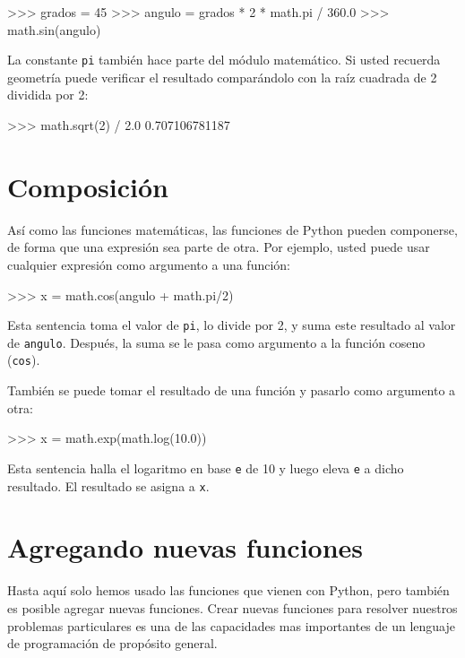 \begin{pyconcode}
>>> grados = 45
>>> angulo = grados * 2 * math.pi / 360.0
>>> math.sin(angulo)
\end{pyconcode}
 La constante \texttt{pi} también hace parte del módulo matemático.
Si usted recuerda geometría puede verificar el resultado comparándolo
con la raíz cuadrada de 2 dividida por 2:

\begin{pyconcode}
>>> math.sqrt(2) / 2.0
0.707106781187
\end{pyconcode}
 

\section{Composición}

 

Así como las funciones matemáticas, las funciones de Python pueden
componerse, de forma que una expresión sea parte de otra. Por ejemplo,
usted puede usar cualquier expresión como argumento a una función:

\begin{pyconcode}
>>> x = math.cos(angulo + math.pi/2)
\end{pyconcode}

Esta sentencia toma el valor de \texttt{pi}, lo divide por 2, y suma
este resultado al valor de \texttt{angulo}. Después, la suma se le
pasa como argumento a la función coseno (\texttt{cos}).

También se puede tomar el resultado de una función y pasarlo como
argumento a otra:
\begin{pyconcode}
>>> x = math.exp(math.log(10.0))
\end{pyconcode}

Esta sentencia halla el logaritmo en base \texttt{e} de 10 y luego
eleva \texttt{e} a dicho resultado. El resultado se asigna a \texttt{x}.

\section{Agregando nuevas funciones}

Hasta aquí solo hemos usado las funciones que vienen con Python, pero
también es posible agregar nuevas funciones. Crear nuevas funciones
para resolver nuestros problemas particulares es una de las capacidades
mas importantes de un lenguaje de programación de propósito general.

